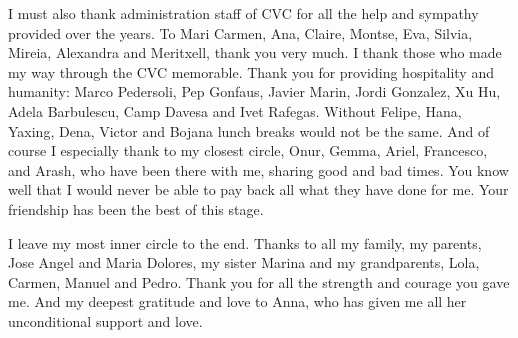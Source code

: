 I must also thank administration staff of CVC for all the help and sympathy provided over the years. To Mari Carmen, Ana, Claire, Montse, Eva, Silvia, Mireia, Alexandra and Meritxell, thank you very much. I thank those who made my way through the CVC memorable. Thank you for providing hospitality and humanity: Marco Pedersoli, Pep Gonfaus, Javier Marin, Jordi Gonzalez, Xu Hu, Adela Barbulescu, Camp Davesa and Ivet Rafegas. Without Felipe, Hana, Yaxing, Dena, Victor and Bojana lunch breaks would not be the same. And of course I especially thank to my closest circle, Onur, Gemma, Ariel, Francesco, and Arash, who have been there with me, sharing good and bad times. You know well that I would never be able to pay back all what they have done for me. Your friendship has been the best of this stage.

I leave my most inner circle to the end. Thanks to all my family, my parents, Jose Angel and Maria Dolores, my sister Marina and my grandparents, Lola, Carmen, Manuel and Pedro. Thank you for all the strength and courage you gave me. And my deepest gratitude and love to Anna, who has given me all her unconditional support and love.
 

